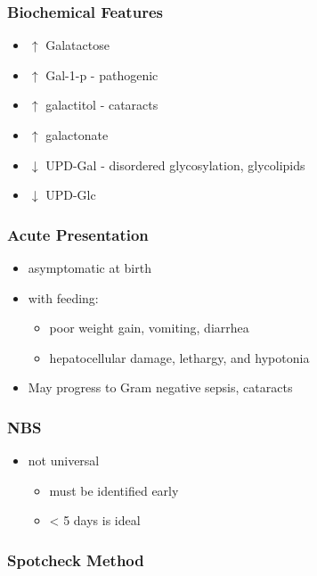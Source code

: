 \documentclass{scrartcl}
\begin{document}
\subsubsection{Biochemical Features}
\label{sec:orgc6bcf01}
\begin{itemize}
\item \(\uparrow\)  Galatactose
\item \(\uparrow\) Gal-1-p - pathogenic
\item \(\uparrow\)  galactitol - cataracts
\item \(\uparrow\) galactonate
\item \(\downarrow\) UPD-Gal - disordered glycosylation, glycolipids
\item \(\downarrow\) UPD-Glc
\end{itemize}

\subsubsection{Acute Presentation}
\label{sec:org1829c42}
\begin{itemize}
\item asymptomatic at birth
\item with feeding:
\begin{itemize}
\item poor weight gain, vomiting, diarrhea
\item hepatocellular damage, lethargy, and hypotonia
\end{itemize}
\item May progress to Gram negative sepsis, cataracts
\end{itemize}

\subsubsection{NBS}
\label{sec:org25bc426}
\begin{itemize}
\item not universal
\begin{itemize}
\item must be identified early
\item \textless{} 5 days is ideal
\end{itemize}
\end{itemize}

\subsubsection{Spotcheck Method}
\label{sec:org0cfba91}
\end{document}

